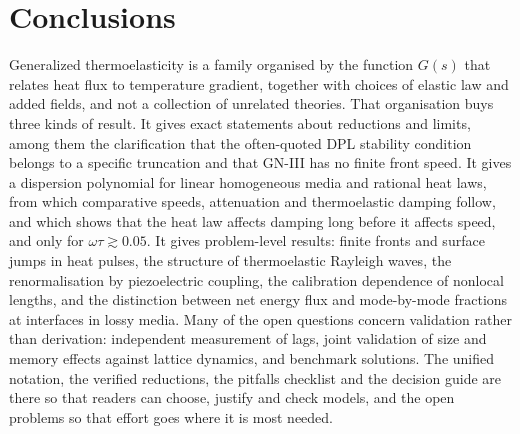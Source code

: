 \section{Conclusions}\label{sec:conclusions}
Generalized thermoelasticity is a family organised by the function $G(s)$ that relates heat flux to temperature gradient, together with choices of elastic law and added fields, and not a collection of unrelated theories. That organisation buys three kinds of result. It gives exact statements about reductions and limits, among them the clarification that the often-quoted DPL stability condition belongs to a specific truncation and that GN-III has no finite front speed. It gives a dispersion polynomial for linear homogeneous media and rational heat laws, from which comparative speeds, attenuation and thermoelastic damping follow, and which shows that the heat law affects damping long before it affects speed, and only for $\omega\tau\gtrsim0.05$. It gives problem-level results: finite fronts and surface jumps in heat pulses, the structure of thermoelastic Rayleigh waves, the renormalisation by piezoelectric coupling, the calibration dependence of nonlocal lengths, and the distinction between net energy flux and mode-by-mode fractions at interfaces in lossy media. Many of the open questions concern validation rather than derivation: independent measurement of lags, joint validation of size and memory effects against lattice dynamics, and benchmark solutions. The unified notation, the verified reductions, the pitfalls checklist and the decision guide are there so that readers can choose, justify and check models, and the open problems so that effort goes where it is most needed.
